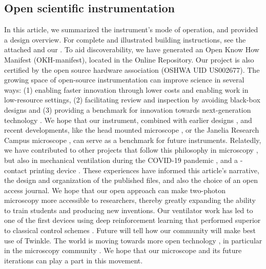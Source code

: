 \documentclass[10pt,letterpaper]{article}
\begin{document}
\subsection*{Open scientific instrumentation}
In this article, we summarized the instrument's mode of operation, and provided a design overview. For complete and illustrated building instructions, see the attached  and our . To aid discoverability, we have generated an Open Know How Manifest (OKH-manifest), located in the Online Repository. Our project is also certified by the open source hardware association (OSHWA UID US002677).\newline
The growing space of open-source instrumentation can improve science in several ways: (1) enabling faster innovation through lower costs and enabling work in low-resource settings, (2) facilitating review and inspection by avoiding black-box designs and (3) providing a benchmark for innovation towards next-generation technology \cite{Lees2024}. We hope that our instrument, combined with earlier designs \cite{Rosenegger2014, Mayrhofer2015, Tan1999}, and recent developments, like the head mounted microscope \cite{Zong2022}, or the Janelia Research Campus microscope \cite{Janelia2024}, can serve as a benchmark for future instruments. Relatedly, we have contributed to other projects that follow this philosophy in microscopy \cite{Scott2018}, but also in mechanical ventilation during the COVID-19 pandemic \cite{LaChance2022,POVMC2022}, and a \textmu-contact printing device \cite{Samhaber2016}. These experiences have informed this article's narrative, the design and organization of the published files, and also the choice of an open access journal. We hope that our open approach can make two-photon microscopy more accessible to researchers, thereby greatly expanding the ability to train students and producing new inventions. Our ventilator work has led to one of the first devices using deep reinforcement learning that performed superior to classical control schemes \cite{Suo2021}. Future will tell how our community will make best use of Twinkle. The world is moving towards more open technology \cite{Schottdorf2024}, in particular in the microscopy community \cite{Hohlbein2022}. We hope that our microscope and its future iterations can play a part in this movement.
\end{document}
